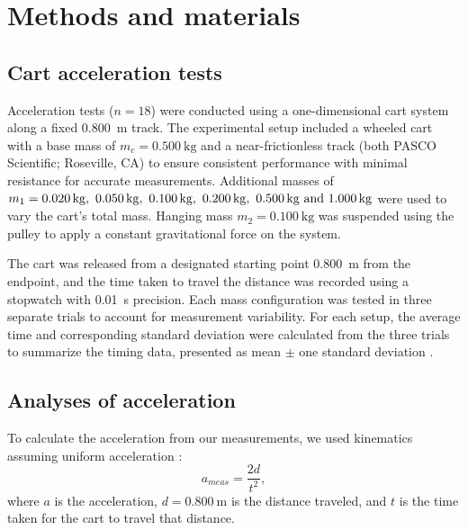 ﻿\documentclass[reprint,amsmath,amssymb,aps]{revtex4-2}
\begin{document}
\section{Methods and materials}

\subsection{Cart acceleration tests}
Acceleration tests ($n=18$) were conducted using a one-dimensional cart system along a fixed \qty{0.800}{\meter} track. The experimental setup included a wheeled cart with a base mass of $m_c=\qty{0.500}{\kilo\gram}$ and a near-frictionless track (both PASCO Scientific; Roseville, CA) to ensure consistent performance with minimal resistance for accurate measurements. Additional masses of $m_1=\qtylist{0.020;0.050;0.100;0.200;0.500;1.000}{\kilo\gram}$ were used to vary the cart’s total mass. Hanging mass $m_2=\qty{0.100}{\kilo\gram}$ was suspended using the pulley to apply a constant gravitational force on the system. 

The cart was released from a designated starting point \qty{0.800}{\meter} from the endpoint, and the time taken to travel the distance was recorded using a stopwatch with \qty{0.01}{\second} precision. Each mass configuration was tested in three separate trials to account for measurement variability. For each setup, the average time and corresponding standard deviation were calculated from the three trials to summarize the timing data, presented as mean $\pm$ one standard deviation \cite{starnes2015practice}.


\subsection{Analyses of acceleration}

To calculate the acceleration from our measurements, we used kinematics assuming uniform acceleration \cite{knight2017physics}:  
\begin{equation}
a_{meas} = \dfrac{2d}{t^2},
\label{eq:ameas}
\end{equation}
where $a$ is the acceleration, $d=\qty{0.800}{\meter}$ is the distance traveled, and $t$ is the time taken for the cart to travel that distance. %
\end{document}
